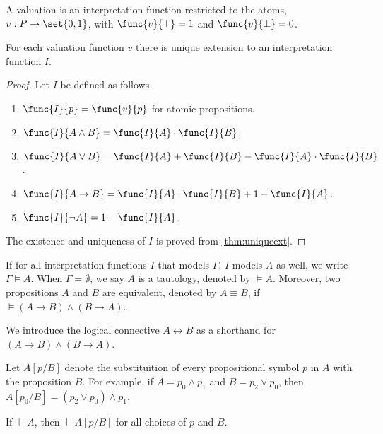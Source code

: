 \begin{definition}
    A valuation is an interpretation function restricted to the atoms, \(v : P \to \set{0,1}\), with \(\func{v}{\top} = 1\) and \(\func{v}{\bot} = 0\).
\end{definition}


\begin{theorem}
    For each valuation function \(v\) there is unique extension to an interpretation function \(I\).
\end{theorem}

\begin{proof}
    Let \(I\) be defined as follows.
    \begin{enumerate}
        \item \(\func{I}{p} = \func{v}{p}\) for atomic propositions.
        \item \(\func{I}{A \land B} = \func{I}{A} \cdot \func{I}{B}\).
        \item \(\func{I}{A \lor B} = \func{I}{A} + \func{I}{B} - \func{I}{A}\cdot \func{I}{B}\).
        \item \(\func{I}{A \to B} = \func{I}{A}\cdot \func{I}{B} + 1 - \func{I}{A}\).
        \item \(\func{I}{\neg A} = 1- \func{I}{A}\).
    \end{enumerate}
    The existence and uniqueness of \(I\) is proved from \cref{thm:uniqueext}.
\end{proof}

\begin{definition}
    If for all interpretation functions \(I\) that models \(\Gamma\), \(I\) models \(A\) as well, we write \(\Gamma \models A\). When \(\Gamma = \emptyset\), we say \(A\) is a tautology, denoted by \(\models A\). Moreover, two propositions \(A\) and \(B\) are equivalent, denoted by \(A \equiv B\), if \(\models (A \to B) \land (B \to A)\).
\end{definition}
We introduce the logical connective \(A \leftrightarrow B\) as a shorthand for \((A \to B) \land (B \to A)\).

Let \(A[p/B]\) denote the substituition of every propositional symbol \(p\) in \(A\) with the proposition \(B\). For example, if \(A = p_0 \land p_1\) and \(B = p_2 \lor p_0\), then \(A[p_0/B] = (p_2 \lor p_0) \land p_1\).

\begin{theorem}
    If \(\models A\), then \(\models A[p/B]\) for all choices of \(p\) and \(B\).
\end{theorem}


